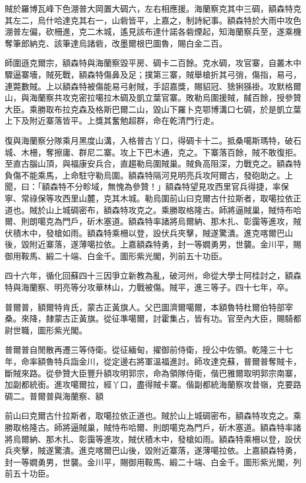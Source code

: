 \begin{pinyinscope}
賊於羅博瓦峰下色淜普大岡置大碉六，左右相應援。海蘭察克其中三碉，額森特克其左二，烏什哈達克其右一，山砦皆平，上嘉之，制詩紀事。額森特於大雨中攻色淜普左偏，砍柵進，克二木城，遙見該布達什諾各砦煙起，知海蘭察兵至，遂乘機奪筆郎納克、該筆達烏諸砦，改墨爾根巴圖魯，賜白金二百。

師圍遜克爾宗，額森特與海蘭察毀平房、碉卡二百餘。克水碉，攻官寨，自叢木中驟逼寨墻，賊死戰，額森特傷鼻及足；撲第三寨，賊舉槍折其弓弰，傷指，易弓，連斃數賊。上以額森特被傷能易弓射賊，手詔嘉獎，賜貂冠、猞猁猻褂。攻默格爾山，與海蘭察共攻克密拉噶拉木碉及凱立葉官寨。敗勒烏圍援賊，馘百餘，授參贊大臣。乘勝取布拉克森及格斯巴爾二山，毀山下羅卜克鄂博溝口七碉，於是凱立葉上下及附近寨落皆平。上獎其奮勉超群，命在乾清門行走。

復與海蘭察分隊乘月黑度山溝，入格普古丫口，得碉卡十二。抵桑噶斯瑪特，破石城、木柵，奪擦庸、群尼二寨。攻上下巴木通，克之。下寨落百餘，賊不敢復拒。至直古腦山頂，與福康安兵合，直趨勒烏圍賊巢。賊負高阻深，力戰克之。額森特負傷不能乘馬，上命駐守勒烏圍。額森特隔河見明亮兵攻阿爾古，發砲助之。上聞，曰：「額森特不分畛域，無愧為參贊！」額森特望見攻西里官兵得捷，率保寧、常祿保等攻西里山麓，克其木城。勒烏圍前山曰克爾古什拉斯者，取噶拉依正道也。賊於山上城碉密布，額森特攻克之。乘勝取格隆古。師將逼賊巢，賊恃布哈爾、則朗噶克為門戶，斫木塞道。額森特率諸將烏爾納、那木扎、彰靄等進攻，賊伏積木中，發槍如雨。額森特乘柵以登，設伏兵夾擊，賊遂驚潰。進克喀爾巴山後，毀附近寨落，遂薄噶拉依。上嘉額森特勇，封一等嫺勇男，世襲。金川平，賜御用鞍馬、緞二十端、白金千。圖形紫光閣，列前五十功臣。

四十六年，循化回蘇四十三因爭立新教為亂，破河州，命從大學士阿桂討之，額森特與海蘭察、明亮等分攻華林山，力戰被傷。賊平，進三等子。四十七年，卒。

普爾普，額爾特肯氏，蒙古正黃旗人。父巴圖濟爾噶爾，本額魯特杜爾伯特部宰桑。來降，隸蒙古正黃旗。從征準噶爾，討霍集占，皆有功。官至內大臣，賜騎都尉世職，圖形紫光閣。

普爾普自閒散再遷三等侍衛。從征緬甸，擢御前侍衛，授公中佐領。乾隆三十七年，命率額魯特兵詣金川，從定邊右將軍溫福進討。師攻達克蘇，普爾普奪賊卡，斷賊來路。從參贊大臣豐升額攻明郭宗，命為領隊侍衛，偕巴雅爾取明郭宗南寨，加副都統銜。進攻噶爾拉，經丫口，盡得賊卡寨。偕副都統海蘭察攻昔嶺，克要路碉二。普爾普與海蘭察、額

前山曰克爾古什拉斯者，取噶拉依正道也。賊於山上城碉密布，額森特攻克之。乘勝取格隆古。師將逼賊巢，賊恃布哈爾、則朗噶克為門戶，斫木塞道。額森特率諸將烏爾納、那木扎、彰靄等進攻，賊伏積木中，發槍如雨。額森特乘柵以登，設伏兵夾擊，賊遂驚潰。進克喀爾巴山後，毀附近寨落，遂薄噶拉依。上嘉額森特勇，封一等嫺勇男，世襲。金川平，賜御用鞍馬、緞二十端、白金千。圖形紫光閣，列前五十功臣。


\end{pinyinscope}
